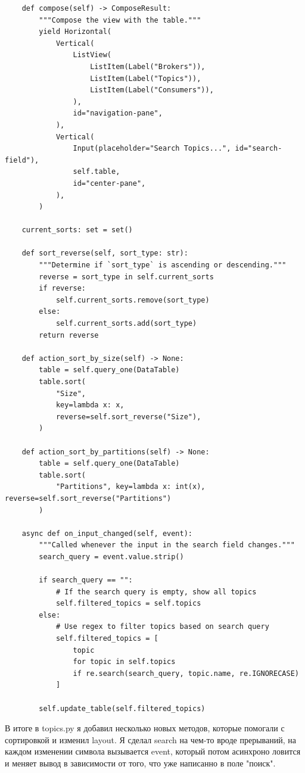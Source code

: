 \documentclass[10pt , a4paper]{report}
\newenvironment{code}{\captionsetup{type=listing}}{}
\begin{document}
\begin{code}
  \begin{verbatim}
    def compose(self) -> ComposeResult:
        """Compose the view with the table."""
        yield Horizontal(
            Vertical(
                ListView(
                    ListItem(Label("Brokers")),
                    ListItem(Label("Topics")),
                    ListItem(Label("Consumers")),
                ),
                id="navigation-pane",
            ),
            Vertical(
                Input(placeholder="Search Topics...", id="search-field"),
                self.table,
                id="center-pane",
            ),
        )

    current_sorts: set = set()

    def sort_reverse(self, sort_type: str):
        """Determine if `sort_type` is ascending or descending."""
        reverse = sort_type in self.current_sorts
        if reverse:
            self.current_sorts.remove(sort_type)
        else:
            self.current_sorts.add(sort_type)
        return reverse

    def action_sort_by_size(self) -> None:
        table = self.query_one(DataTable)
        table.sort(
            "Size",
            key=lambda x: x,
            reverse=self.sort_reverse("Size"),
        )

    def action_sort_by_partitions(self) -> None:
        table = self.query_one(DataTable)
        table.sort(
            "Partitions", key=lambda x: int(x), reverse=self.sort_reverse("Partitions")
        )

    async def on_input_changed(self, event):
        """Called whenever the input in the search field changes."""
        search_query = event.value.strip()

        if search_query == "":
            # If the search query is empty, show all topics
            self.filtered_topics = self.topics
        else:
            # Use regex to filter topics based on search query
            self.filtered_topics = [
                topic
                for topic in self.topics
                if re.search(search_query, topic.name, re.IGNORECASE)
            ]

        self.update_table(self.filtered_topics)
  \end{verbatim}
\end{code}

В итоге в topics.py я добавил несколько новых методов, которые помогали с сортировкой и изменил layout. Я сделал search на чем-то вроде прерываний, на каждом изменении символа вызывается event, который потом асинхроно ловится и меняет вывод в зависимости от того, что уже написанно в поле "поиск".
\end{document}
